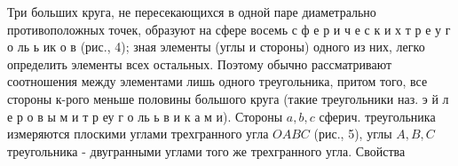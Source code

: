 \documentclass[10pt]{article}
\begin{document}
Три больших круга, не пересекающихся в одной паре диаметрально противоположных точек, образуют на сфере восемь с ф е р и ч е с к и х т р е у г о ль ь ик о в (рис., 4); зная элементы (углы и стороны) одного из них, легко определить элементы всех остальных. Поэтому обычно рассматривают соотношения между элементами лишь одного треугольника, притом того, все стороны к-рого меньше половины большого круга (такие треугольники наз. э й л е р о в ы м и т р еу г о ль ь в и к а м и). Стороны $a, b, c$ сферич. треугольника измеряются плоскими углами трехгранного угла $O A B C$ (рис., 5), углы $A, B, C$ треугольника - двугранными углами того же трехгранного угла. Свойства
\end{document}
